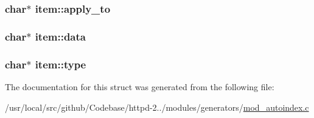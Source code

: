 \subsubsection[{\texorpdfstring{apply\+\_\+to}{apply_to}}]{\setlength{\rightskip}{0pt plus 5cm}char$\ast$ item\+::apply\+\_\+to}\hypertarget{structitem_ad5eb974ccaab2a13ab204a4969e5b383}{}\label{structitem_ad5eb974ccaab2a13ab204a4969e5b383}
\subsubsection[{\texorpdfstring{data}{data}}]{\setlength{\rightskip}{0pt plus 5cm}char$\ast$ item\+::data}\hypertarget{structitem_a24e717f0cfeb9dcd279549a4c428d4e2}{}\label{structitem_a24e717f0cfeb9dcd279549a4c428d4e2}
\subsubsection[{\texorpdfstring{type}{type}}]{\setlength{\rightskip}{0pt plus 5cm}char$\ast$ item\+::type}\hypertarget{structitem_af87efd5ddd0a63f3135ca571c3477dad}{}\label{structitem_af87efd5ddd0a63f3135ca571c3477dad}


The documentation for this struct was generated from the following file\+:\begin{DoxyCompactItemize}
\item 
/usr/local/src/github/\+Codebase/httpd-\/2../modules/generators/\hyperlink{mod__autoindex_8c}{mod\+\_\+autoindex.\+c}\end{DoxyCompactItemize}
